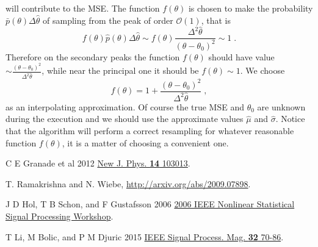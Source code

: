 \documentclass[aps, pra, 10pt, twocolumn, superscriptaddress,floatfix]{revtex4-1}
\begin{document}
%
will contribute to the MSE. The function $f(\theta)$ is chosen to make the probability $\bar{p} (\theta) \Delta \hat{\theta}$ of sampling from the peak of order $\mathcal{O}(1)$, that is
%
\begin{equation}
	f(\theta) \hat{p} (\theta) \Delta \hat{\theta} \sim f(\theta) \frac{\Delta^2 \hat{\theta}}{(\theta-\theta_0)^2} \sim 1 \; . 
\end{equation}
%
Therefore on the secondary peaks the function $f(\theta)$ should have value $\sim \frac{(\theta-\theta_0)^2}{\Delta^2 \hat{\theta}}$, while near the principal one it should be $f(\theta) \sim 1$. We choose
%
\begin{equation}
f(\theta) = 1 + \frac{(\theta-\theta_0)^2}{\Delta^2 \hat{\theta}} \; ,
\end{equation}
%
as an interpolating approximation. Of course the true MSE and $\theta_0$ are unknown during the execution and we should use the approximate values $\hat{\mu}$ and $\hat{\sigma}$. Notice that the algorithm will perform a correct resampling for whatever reasonable function $f(\theta)$, it is a matter of choosing a convenient one. 



\begin{thebibliography}{100}
	
 C E Granade et al 2012 \href{https://doi.org/10.1088/1367-2630/14/10/103013}{New J. Phys. {\bf 14} 103013}.

 T. Ramakrishna and N. Wiebe, \href{http://arxiv.org/abs/2009.07898}{http://arxiv.org/abs/2009.07898}.

 J D Hol, T B Schon, and F Gustafsson 2006 \href{http://ieeexplore.ieee.org/document/4378824/}{2006 IEEE Nonlinear Statistical Signal Processing Workshop}.

 T Li, M Bolic, and P M Djuric 2015 \href{https://ieeexplore.ieee.org/document/7079001/}{IEEE Signal Process. Mag. {\bf 32} 70-86}.


\end{thebibliography}
\end{document}

